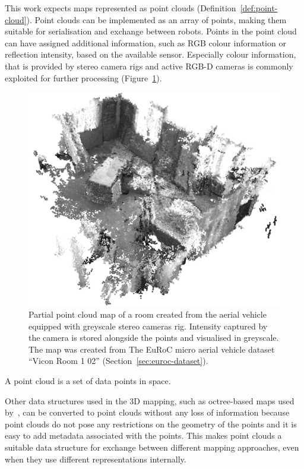 This work expects maps represented as point clouds (Definition~\ref{def:point-cloud}). Point clouds can be implemented as an array of points, making them suitable for serialisation and exchange between robots. Points in the point cloud can have assigned additional information, such as \gls{RGB} colour information or reflection intensity, based on the available sensor. Especially colour information, that is provided by stereo camera rigs and active \gls{RGB-D} cameras is commonly exploited for further processing (Figure~\ref{fig:v1-greyscale}).

\begin{figure}
    \centering
    \includegraphics[width=\textwidth]{../img/v1-greyscale.png}
    \caption[Point cloud map with greyscale colours]{Partial point cloud map of a room created from the aerial vehicle equipped with greyscale stereo cameras rig. Intensity captured by the camera is stored alongside the points and visualised in greyscale. The map was created from The EuRoC micro aerial vehicle dataset ``Vicon Room 1 02'' (Section~\ref{sec:euroc-dataset}).}
    \label{fig:v1-greyscale}
\end{figure}

\begin{defn}
\label{def:point-cloud}
A point cloud is a set of data points in space.
\end{defn}

Other data structures used in the \gls{3D} mapping, such as octree-based maps used by~\citet{hornung2013octomap}, can be converted to point clouds without any loss of information because point clouds do not pose any restrictions on the geometry of the points and it is easy to add metadata associated with the points. This makes point clouds a suitable data structure for exchange between different mapping approaches, even when they use different representations internally.

